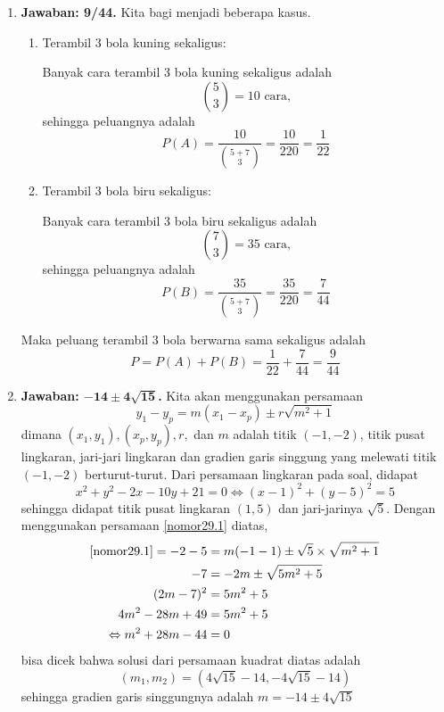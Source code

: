 \begin{enumerate}
\item \textbf{Jawaban: 9/44.} Kita bagi menjadi beberapa kasus.
	\begin{enumerate}
	\item Terambil 3 bola kuning sekaligus:
		\par Banyak cara terambil 3 bola kuning sekaligus adalah \[\binom{5}{3} = 10\text{ cara,}\]sehingga peluangnya adalah \[P(A) = \frac{10}{\displaystyle \binom{5+7}{3}} = \frac{10}{220} = \frac{1}{22}\]
	\item Terambil 3 bola biru sekaligus:
		\par Banyak cara terambil 3 bola biru sekaligus adalah \[\binom{7}{3} = 35\text{ cara,}\]sehingga peluangnya adalah \[P(B) = \frac{35}{\displaystyle \binom{5+7}{3}} = \frac{35}{220} = \frac{7}{44}\]
	\end{enumerate}
Maka peluang terambil 3 bola berwarna sama sekaligus adalah \[P = P(A) + P(B) = \frac{1}{22} + \frac{7}{44} = \frac{9}{44}\]

\item \textbf{Jawaban: $\boldsymbol{-14\pm4\sqrt{15}}$.} Kita akan menggunakan persamaan \begin{equation}\label{nomor29.1}y_1 - y_p = m(x_1-x_p) \pm r\sqrt{m^2+1}\end{equation}dimana $(x_1,y_1),(x_p,y_p), r,$ dan $m$ adalah titik $(-1,-2)$, titik pusat lingkaran, jari-jari lingkaran dan gradien garis singgung yang melewati titik $(-1,-2)$ berturut-turut. Dari persamaan lingkaran pada soal, didapat \[x^2+y^2 - 2x - 10y + 21 = 0\Leftrightarrow (x-1)^2 + (y-5)^2 = 5\]sehingga didapat titik pusat lingkaran $(1,5)$ dan jari-jarinya $\sqrt{5}$. Dengan menggunakan persamaan \eqref{nomor29.1} diatas,
	\begin{align*}
	\text{\eqref{nomor29.1}} = -2 - 5 &= m(-1 -1)\pm \sqrt{5}\times\sqrt{m^2+1}\\
			-7 &= -2m \pm \sqrt{5m^2+5}\\
			(2m - 7)^2 &= 5m^2+5\\
			4m^2-28m+49 &= 5m^2+5\\
			\Leftrightarrow m^2+28m-44 &= 0
	\end{align*}
bisa dicek bahwa solusi dari persamaan kuadrat diatas adalah \[(m_1, m_2) = (4\sqrt{15}-14, -4\sqrt{15}-14)\]sehingga gradien garis singgungnya adalah $m = -14\pm4\sqrt{15}$


\end{enumerate}
